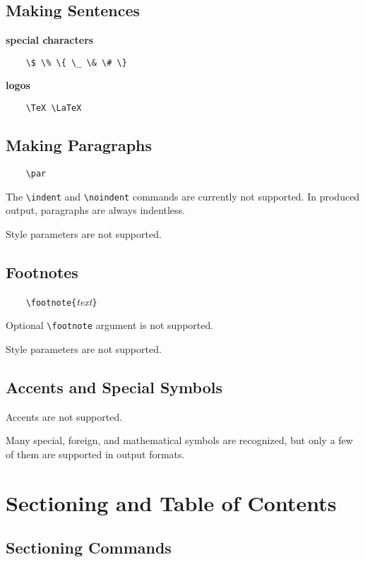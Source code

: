 \subsection{Making Sentences}

{\bf special characters}

\verb'    \$ \% \{ \_ \& \# \}'

{\bf logos}

\verb'    \TeX \LaTeX'

\subsection{Making Paragraphs}

\verb'    \par'

The \verb'\indent' and \verb'\noindent' commands are currently not supported.
In produced output, paragraphs are always indentless.

Style parameters are not supported. %

\subsection{Footnotes}

\verb'    \footnote{'{\it text}\verb'}'

Optional \verb'\footnote' argument is not supported.

Style parameters are not supported. %

\subsection{Accents and Special Symbols}

Accents are not supported.

Many special, foreign, and  mathematical symbols are recognized,
but only a few of them are supported in output formats.

\section{Sectioning and Table of Contents}

\subsection{Sectioning Commands}

